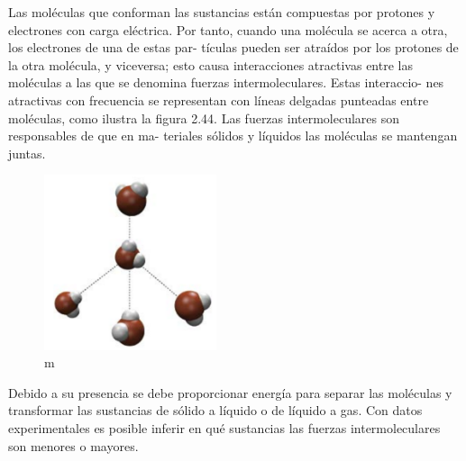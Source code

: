 \documentclass[12pt]{guia}
\begin{document}
\begin{questions}
{\begin{tcolorbox}
            Las moléculas que conforman las sustancias están compuestas
            por protones y electrones con carga eléctrica. Por tanto, cuando
            una molécula se acerca a otra, los electrones de una de estas par-
            tículas pueden ser atraídos por los protones de la otra molécula,
            y viceversa; esto causa interacciones atractivas entre las moléculas
            a las que se denomina fuerzas intermoleculares. Estas interaccio-
            nes atractivas con frecuencia se representan con líneas delgadas
            punteadas entre moléculas, como ilustra la figura 2.44.
            Las fuerzas intermoleculares son responsables de que en ma-
            teriales sólidos y líquidos las moléculas se mantengan juntas.
            \begin{figure}[H]
                \includegraphics[width=0.45\textwidth]{../images/20230321054752.png}
                \caption{m}
                \label{fig:20230321054752}
            \end{figure}
            Debido a su presencia se debe proporcionar energía para separar
            las moléculas y transformar las sustancias de sólido a líquido o de
            líquido a gas. Con datos experimentales es posible inferir en qué
            sustancias las fuerzas intermoleculares son menores o mayores.
        \end{tcolorbox}
    }
    \fullwidth{
        \begin{tcolorbox}[enhanced,fit to height=5cm,
                colback=green!25!black!10!white,colframe=green!75!black,title=Fit box (5cm),
                drop fuzzy shadow,watermark color=white,watermark text=Fit]
        \end{tcolorbox}
    }
\end{questions}
\end{document}
